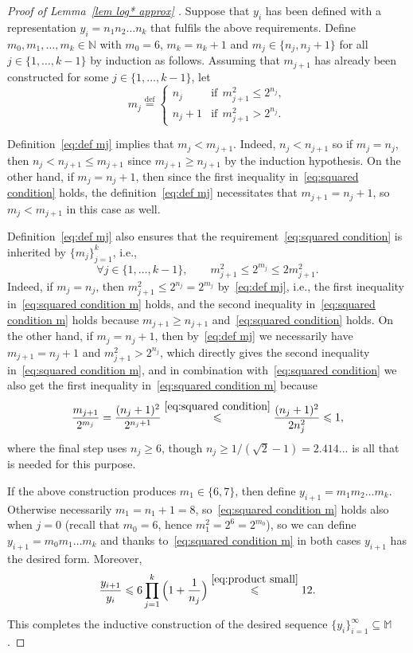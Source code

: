 \documentclass[11pt,reqno]{amsart}
\renewcommand{\le}{\leqslant}
\renewcommand{\ge}{\geqslant}
\theoremstyle{remark}
\renewcommand{\subset}{\subseteq}
\newcommand{\N}{\mathbb N}
\newcommand{\eqdef}{\stackrel{\mathrm{def}}{=}}
\renewcommand{\1}{\mathbf 1}
\begin{document}
\begin{proof}[Proof of Lemma~\ref{lem log* approx} ]
Suppose that $y_i$ has been defined with a representation $y_i=n_1n_2\ldots n_k$ that fulfils the above requirements. Define $m_0,m_1,\ldots,m_k\in \N$ with $m_0=6$, $m_k=n_k+1$ and $m_j\in \{n_j,n_j+1\}$ for all $j\in \{1,\ldots,k-1\}$ by  induction as follows. Assuming that $m_{j+1}$ has already been constructed for some $j\in \{1,\ldots,k-1\}$, let
\begin{equation}\label{eq:def mj}
m_j\eqdef \left\{\begin{array}{ll}n_j&\mathrm{if}\ \ m_{j+1}^2\le 2^{n_j},\\
n_j+1&\mathrm{if}\ \ m_{j+1}^2>2^{n_j}.\end{array}\right.
\end{equation}


Definition~\eqref{eq:def mj} implies that $m_j<m_{j+1}$. Indeed,  $n_j<n_{j+1}$ so if $m_j=n_j$, then $n_j<n_{j+1}\le m_{j+1}$ since $m_{j+1}\ge n_{j+1}$ by the induction hypothesis. On the other hand,  if $m_j=n_j+1$, then since the first inequality in~\eqref{eq:squared condition} holds, the definition~\eqref{eq:def mj} necessitates that $m_{j+1}=n_j+1$, so $m_j<m_{j+1}$ in this case as well.

Definition~\eqref{eq:def mj} also ensures that the requirement~\eqref{eq:squared condition} is inherited by $\{m_j\}_{j=1}^k$, i.e.,
\begin{equation}\label{eq:squared condition m}
\forall j\in \{1,\ldots,k-1\},\qquad m_{j+1}^2 \le 2^{m_j}\le 2m_{j+1}^2.
\end{equation}
Indeed, if $m_j=n_j$, then $m_{j+1}^2\le 2^{n_j}=2^{m_j}$ by~\eqref{eq:def mj}, i.e., the first inequality in~\eqref{eq:squared condition m} holds, and  the second inequality in~\eqref{eq:squared condition m} holds because $m_{j+1}\ge n_{j+1}$ and~\eqref{eq:squared condition} holds. On the other hand, if $m_j=n_j+1$, then by~\eqref{eq:def mj} we necessarily have $m_{j+1}=n_j+1$ and   $m_{j+1}^2>2^{n_j}$, which directly gives the second inequality in~\eqref{eq:squared condition m}, and in combination with~\eqref{eq:squared condition} we also get the first inequality in~\eqref{eq:squared condition m} because
$$
\frac{m_{j+1}}{2^{m_j}}=\frac{(n_j+1)^2}{2^{n_j+1}}\stackrel{\eqref{eq:squared condition}}{\le} \frac{(n_j+1)^2}{2n_j^2}\le 1,
$$
where the final step uses $n_j\ge 6$, though $n_j\ge 1/(\sqrt{2}-1)=2.414...$ is all that is  needed for this purpose.



If the above construction produces $m_1\in \{6,7\}$, then define $y_{i+1}=m_1m_2\ldots m_k$. Otherwise necessarily $m_1=n_1+1=8$, so~\eqref{eq:squared condition m} holds also when $j=0$ (recall that $m_0=6$, hence $m_1^2=2^6=2^{m_0}$), so  we can define $y_{i+1}=m_0m_1\ldots m_k$ and thanks to~\eqref{eq:squared condition m} in both cases $y_{i+1}$ has the desired form. Moreover,
$$
\frac{y_{i+1}}{y_i}\le 6\prod_{j=1}^k \Big(1+\frac{1}{n_j}\Big)\stackrel{\eqref{eq:product small}}{\le} 12.
$$
This completes the inductive construction of the desired sequence $\{y_i\}_{i=1}^\infty\subset \mathbb{M}$.



\end{proof}
\end{document}

